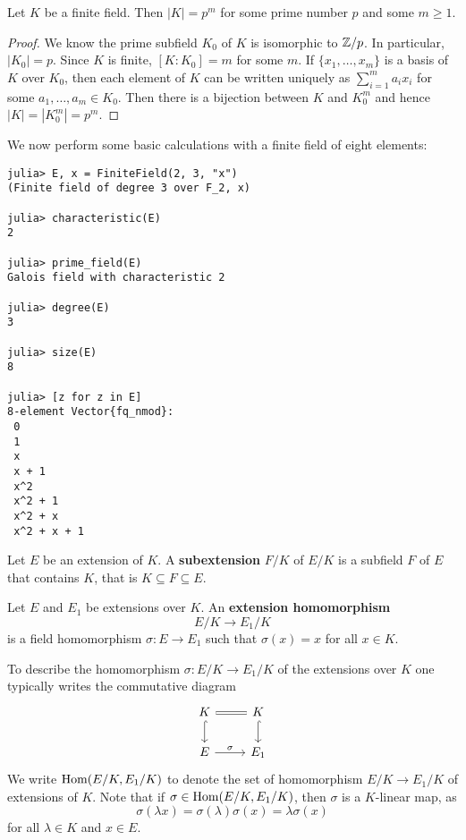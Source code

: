 \begin{proposition}
	Let $K$ be a finite field. Then $|K|=p^m$ 
	for some prime number $p$ and some $m\geq1$. 
\end{proposition}

\begin{proof}
	We know the prime subfield $K_0$ of $K$ is isomorphic to $\mathbb{Z}/p$. 
	In particular, $|K_0|=p$. Since $K$ is finite, 
	$[K:K_0]=m$ for some $m$. If $\{x_1,\dots,x_m\}$ is a basis
	of $K$ over $K_0$, then each element
	of $K$ can be written uniquely as
	$\sum_{i=1}^ma_ix_i$ for some $a_1,\dots,a_m\in K_0$. Then
	there is a bijection between $K$ and $K_0^m$ and hence $|K|=|K_0^m|=p^m$. 
\end{proof}

We now perform some basic calculations 
with a finite field of eight elements: 
\begin{lstlisting}
julia> E, x = FiniteField(2, 3, "x")
(Finite field of degree 3 over F_2, x)

julia> characteristic(E)
2

julia> prime_field(E)
Galois field with characteristic 2

julia> degree(E)
3

julia> size(E)
8

julia> [z for z in E]
8-element Vector{fq_nmod}:
 0
 1
 x
 x + 1
 x^2
 x^2 + 1
 x^2 + x
 x^2 + x + 1
\end{lstlisting}



\begin{definition}
	Let $E$ be an extension of $K$. A \textbf{subextension} $F/K$ 
	of $E/K$ is a subfield $F$ of $E$ that contains $K$, that is
	$K\subseteq F\subseteq E$. 
\end{definition}

\begin{definition}
Let $E$ and $E_1$ be extensions over $K$. An \textbf{extension
homomorphism} 
\[
E/K\to E_1/K
\]
is a field homomorphism $\sigma\colon E\to E_1$ such that $\sigma(x)=x$ for all $x\in K$. 
\end{definition}

To describe the homomorphism $\sigma\colon E/K\to E_1/K$ of the extensions over $K$
one typically writes the commutative diagram 
\[
	\begin{tikzcd}
	K & K \\
	E & {E_1} 
	\arrow["\sigma", from=2-1, to=2-2]
	\arrow[equal, no head, from=1-1, to=1-2]
	\arrow[hook, from=1-1, to=2-1]
	\arrow[hook, from=1-2, to=2-2]
\end{tikzcd}
\]
We write $\operatorname{Hom}(E/K,E_1/K)$ to denote
the set of homomorphism $E/K\to E_1/K$ of extensions of $K$. Note
that if $\sigma\in\operatorname{Hom}(E/K,E_1/K)$, then
$\sigma$ is a $K$-linear map, as
\[
	\sigma(\lambda x)=\sigma(\lambda)\sigma(x)=\lambda\sigma(x)
\]
for all $\lambda\in K$ and $x\in E$. 

